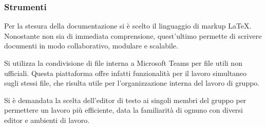     \subsubsection{Strumenti}
      \subsubsubsection{\LaTeX}
        Per la stesura della documentazione si è scelto il linguaggio di markup \LaTeX{}. Nonostante non sia di immediata comprensione, quest'ultimo permette di scrivere documenti in modo collaborativo, modulare e scalabile.

        Si utilizza la condivisione di file interna a Microsoft Teams per file utili non ufficiali. Questa piattaforma offre infatti funzionalità per il lavoro simultaneo sugli stessi file, che risulta utile per l'organizzazione interna del lavoro di gruppo.

        Si è demandata la scelta dell'editor di testo ai singoli membri del gruppo per permettere un lavoro più efficiente, data la familiarità di ognuno con diversi editor e ambienti di lavoro.
	  
